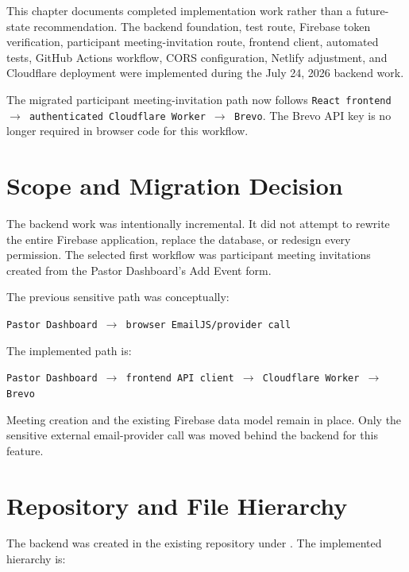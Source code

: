 \documentclass[11pt,a4paper,oneside]{report}
\begin{document}
This chapter documents completed implementation work rather than a future-state recommendation. The backend foundation, test route, Firebase token verification, participant meeting-invitation route, frontend client, automated tests, GitHub Actions workflow, CORS configuration, Netlify adjustment, and Cloudflare deployment were implemented during the July 24, 2026 backend work.

\begin{notebox}
The migrated participant meeting-invitation path now follows \texttt{React frontend $\rightarrow$ authenticated Cloudflare Worker $\rightarrow$ Brevo}. The Brevo API key is no longer required in browser code for this workflow.
\end{notebox}

\section{Scope and Migration Decision}

The backend work was intentionally incremental. It did not attempt to rewrite the entire Firebase application, replace the database, or redesign every permission. The selected first workflow was participant meeting invitations created from the Pastor Dashboard's Add Event form.

The previous sensitive path was conceptually:

\begin{center}
\texttt{Pastor Dashboard $\rightarrow$ browser EmailJS/provider call}
\end{center}

The implemented path is:

\begin{center}
\texttt{Pastor Dashboard $\rightarrow$ frontend API client $\rightarrow$ Cloudflare Worker $\rightarrow$ Brevo}
\end{center}

Meeting creation and the existing Firebase data model remain in place. Only the sensitive external email-provider call was moved behind the backend for this feature.

\section{Repository and File Hierarchy}

The backend was created in the existing repository under . The implemented hierarchy is:
\end{document}
